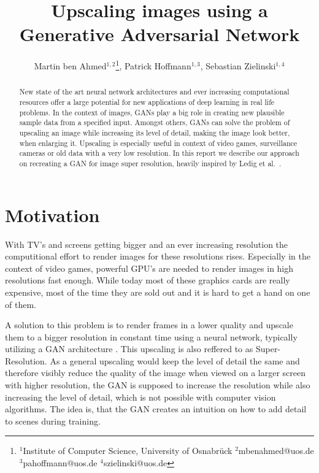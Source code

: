 \documentclass[11pt,twocolumn,twoside,paper=a4]{IEEEtran}
\begin{document}
\title{\vspace{0.2in}\sc Upscaling images using a Generative Adversarial Network}
\author{Martin ben Ahmed$^{1,2}$\thanks{$^1$Institute of Computer Science, University of Osnabrück $^2$mbenahmed@uos.de $^3$pahoffmann@uos.de $^4$szielinski@uos.de}, Patrick Hoffmann$^{1,3}$, Sebastian Zielinski$^{1,4}$}

\maketitle
\thispagestyle{fancy}
\begin{abstract}
New state of the art neural network architectures and ever increasing computational resources
offer a large potential for new applications of deep learning in real life problems.
In the context of images, GANs play a big role in creating new plausible sample data from a specified input.
Amongst others, GANs can solve the problem of upscaling an image while increasing its level of detail, making the image look better, when enlarging it. Upscaling is especially useful in context of video games, surveillance cameras or old data with a very low resolution.
In this report we describe our approach on recreating a GAN for image super resolution, heavily
inspired by Ledig et al.~\cite{DBLP:journals/corr/LedigTHCATTWS16}.
\end{abstract}

\section{Motivation}

With TV's and screens getting bigger and an ever increasing resolution the computitional effort to render images for these resolutions rises. Especially in the context of video games, powerful GPU's are needed to render images in high resolutions fast enough. While today most of these graphics cards are really expensive, most of the time they are sold out and it is hard to get a hand on one of them.

A solution to this problem is to render frames in a lower quality and upscale them to a bigger resolution in constant time using a neural network, typically utilizing a GAN architecture \cite{watson2020deep}.
This upscaling is also reffered to as Super-Resolution.
As a general upscaling would keep the level of detail the same and therefore visibly reduce the quality of the image when viewed on a larger screen with higher resolution, the GAN is supposed to increase the resolution while also increasing the level of detail, which is not possible with computer vision algorithms.
The idea is, that the GAN creates an intuition on how to add detail to scenes during training.
\end{document}
